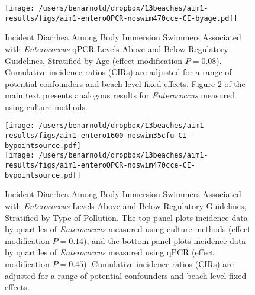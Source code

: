 \documentclass[12pt]{article}\usepackage[]{graphicx}\usepackage[]{color}
\begin{document}
\begin{figure}
\begin{center}
\texttt{[image: /users/benarnold/dropbox/13beaches/aim1-results/figs/aim1-enteroQPCR-noswim470cce-CI-byage.pdf]} \\
\caption{Incident Diarrhea Among Body Immersion Swimmers Associated with \textit{Enterococcus} qPCR Levels Above and Below Regulatory Guidelines, Stratified by Age (effect modification $P=0.08$). Cumulative incidence ratios (CIRs) are adjusted for a range of potential confounders and beach level fixed-effects. Figure 2 of the main text presents analogous results for \textit{Enterococcus} measured using culture methods. \label{fig:enteroQCPRage}}
\end{center}
\end{figure}


\begin{figure}
\begin{center}
\texttt{[image: /users/benarnold/dropbox/13beaches/aim1-results/figs/aim1-entero1600-noswim35cfu-CI-bypointsource.pdf]} \\
\texttt{[image: /users/benarnold/dropbox/13beaches/aim1-results/figs/aim1-enteroQPCR-noswim470cce-CI-bypointsource.pdf]}
\caption{Incident Diarrhea Among Body Immersion Swimmers Associated with \textit{Enterococcus} Levels Above and Below Regulatory Guidelines, Stratified by Type of Pollution. The top panel plots incidence data by quartiles of \textit{Enterococcus} measured using culture methods (effect modification $P=0.14$), and the bottom panel plots incidence data by quartiles of \textit{Enterococcus} measured using qPCR (effect modification $P=0.45$).  Cumulative incidence ratios (CIRs) are adjusted for a range of potential confounders and beach level fixed-effects. \label{fig:enteropol}}
\end{center}
\end{figure}



\clearpage
\end{document}
